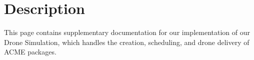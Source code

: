 \hypertarget{index_intro_sec}{}\section{Description}\label{index_intro_sec}
This page contains supplementary documentation for our implementation of our Drone Simulation, which handles the creation, scheduling, and drone delivery of A\+C\+ME packages. 